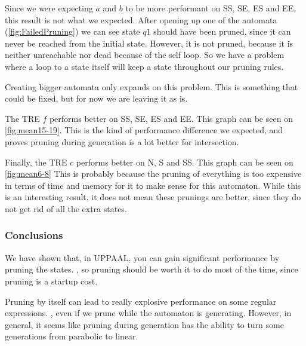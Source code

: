 \resizebox{\columnwidth}{!}{
    
}

\resizebox{\columnwidth}{!}{
    
}
\label{fig:mean3-5}

Since we were expecting $a$ and $b$ to be more performant on SS, SE, ES and EE, this result is not what we expected.
After opening up one of the automata (\cref{fig:FailedPruning}) we can see state $q1$ should have been pruned, since it can never be reached from the initial state.
However, it is not pruned, because it is neither unreachable nor dead because of the self loop.
So we have a problem where a loop to a state itself will keep a state throughout our pruning rules.


\label{fig:FailedPruning}

Creating bigger automata only expands on this problem. This is something that could be fixed, but for now we are leaving it as is.

The TRE $f$ performs better on SS, SE, ES and EE.
This graph can be seen on \cref{fig:mean15-19}.
This is the kind of performance difference we expected, and proves pruning during generation is a lot better for intersection.

\resizebox{\columnwidth}{!}{
    
}

\resizebox{\columnwidth}{!}{
    
}
\label{fig:mean15-19}

Finally, the TRE $c$ performs better on N, S and SS.
This graph can be seen on \cref{fig:mean6-8}
This is probably because the pruning of everything is too expensive in terms of time and memory for it to make sense for this automaton.
While this is an interesting result, it does not mean these prunings are better, since they do not get rid of all the extra states.

\resizebox{\columnwidth}{!}{
    
}

\resizebox{\columnwidth}{!}{
    
}
\label{fig:mean6-8}

\subsubsection{Conclusions}
We have shown that, in UPPAAL, you can gain significant performance by pruning the states.
, so pruning should be worth it to do most of the time, since pruning is a startup cost.

Pruning by itself can lead to really explosive performance on some regular expressions.
, even if we prune while the automaton is generating.
However, in general, it seems like pruning during generation has the ability to turn some generations from parabolic to linear.
